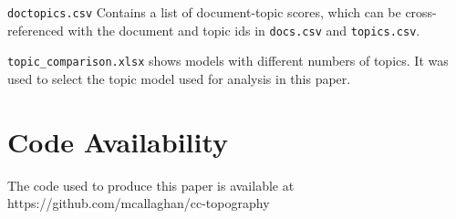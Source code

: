 \documentclass{article}
\begin{document}
	\medskip\noindent
	\texttt{doctopics.csv} Contains a list of document-topic scores, which can be cross-referenced with the document and topic ids in \texttt{docs.csv} and \texttt{topics.csv}.
	
	\medskip\noindent
	\texttt{topic\_comparison.xlsx} shows models with different numbers of topics. It was used to select the topic model used for analysis in this paper.
	
	\section*{Code Availability}
	
	The code used to produce this paper is available at https://github.com/mcallaghan/cc-topography
	
	
	
	
	
	
	
\end{document}
